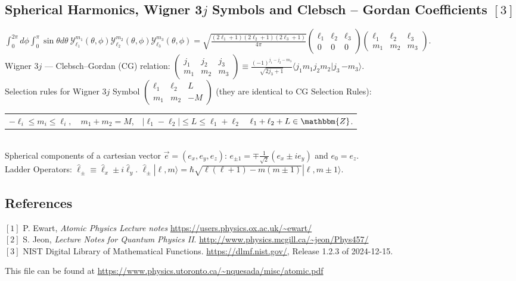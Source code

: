 \documentclass[english,11pt]{shreyasnotes}
\begin{document}
\subsection*{Spherical Harmonics, Wigner 3$j$ Symbols and Clebsch -- Gordan Coefficients $[3]$}
$\int_0^{2 \pi} d\phi \int_0^{\pi} \sin \theta d\theta \ \mathcal{Y}_{\ell_1}^{m_1}(\theta,\phi) \mathcal{Y}_{\ell_2}^{m_2}(\theta,\phi) \mathcal{Y}_{\ell_3}^{m_3}(\theta,\phi)=\sqrt{\frac{(2\ell_1+1)(2\ell_2+1)(2\ell_3+1)}{4 \pi}} \begin{pmatrix}
  \ell_1 & \ell_2 & \ell_3\\
  0 & 0 & 0
\end{pmatrix}
\begin{pmatrix}
  \ell_1 & \ell_2 & \ell_3\\
  m_1 & m_2 & m_3
\end{pmatrix}
$.
\\

\noindent Wigner 3$j$ --- Clebsch--Gordan (CG) relation:
$
\begin{pmatrix}
  j_1 & j_2 & j_3\\
  m_1 & m_2 & m_3
\end{pmatrix}
\equiv \frac{(-1)^{j_1-j_2-m_3}}{\sqrt{2j_3+1}} \langle j_1 m_1 j_2 m_2 | j_3 \, {-m_3} \rangle.$\\

\noindent Selection rules for Wigner 3$j$ Symbol $\begin{pmatrix}  \ell_1 & \ell_2 & L\\   m_1 & m_2 & -M \end{pmatrix}$ (they are identical to CG Selection Rules):

\noindent 
\begin{tabular}{llll}
$-\ell_i \leq m_i \leq \ell_i, $ & $m_1+m_2=M$, & $|\ell_1-\ell_2|\leqslant L \leqslant \ell_1+\ell_2$ & $\ell_1+\ell_2+L \in \mathbbm{Z}$.
\end{tabular}
\\

\noindent Spherical components of a cartesian vector $\vec e=(e_x,e_y,e_z)$: $e_{\pm 1}=\mp \frac{1}{\sqrt{2}} \left( e_x\pm i e_y \right)$ and $e_0=e_z$.\\

\noindent Ladder Operators: $ \hat \ell_{\pm}\equiv \hat \ell_x\pm i \hat \ell_y$. \space \space \space $\hat \ell_{\pm} |\ell,m \rangle=\hbar \sqrt{\ell(\ell+1)-m(m\pm1)}|\ell,m\pm1 \rangle$.

\subsection*{References}
$[1]$ P. Ewart, \textit{Atomic Physics Lecture notes} \url{https://users.physics.ox.ac.uk/~ewart/}\\
$[2]$ S. Jeon, \textit{Lecture Notes for Quantum Physics II}. \url{http://www.physics.mcgill.ca/~jeon/Phys457/}\\
$[3]$ NIST Digital Library of Mathematical Functions. \url{https://dlmf.nist.gov/}, Release 1.2.3 of 2024-12-15. %

\begin{center}
{\tiny This file can be found at \url{https://www.physics.utoronto.ca/~nquesada/misc/atomic.pdf} }
\end{center}
\end{document}
